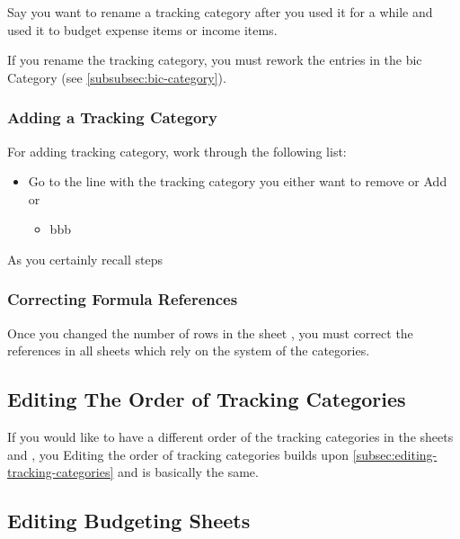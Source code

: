 Say you want to rename a tracking category after you used it for a while and used it to budget expense items or income items.
\begin{specialnote}
	If you rename the tracking category, you must rework the entries in the \ac{bic} Category (see \autoref{subsubsec:bic-category}).
\end{specialnote}

\subsubsection{Adding a Tracking Category}
\label{subsubsec:adding-a-tracking-category}

For adding tracking category, work through the following list:
\begin{itemize}
	\item Go to the line with the tracking category you either want to remove or Add or 
	\begin{itemize}
		\item bbb
	\end{itemize}
\end{itemize}
As you certainly recall steps 

\subsubsection{Correcting Formula References}
\label{subsubsec:correct-formula-references}

Once you changed the number of rows in the sheet , you must correct the references in all sheets which rely on the system of the categories.

\subsection{Editing The Order of Tracking Categories}
\label{subsec:editing-order-of-tracking-categories}

If you would like to have a different order of the tracking categories in the sheets  and , you 
Editing the order of tracking categories builds upon \autoref{subsec:editing-tracking-categories} and is basically the same.

\subsection{Editing Budgeting Sheets}
\label{subsec:editing-budgeting-sheets}

